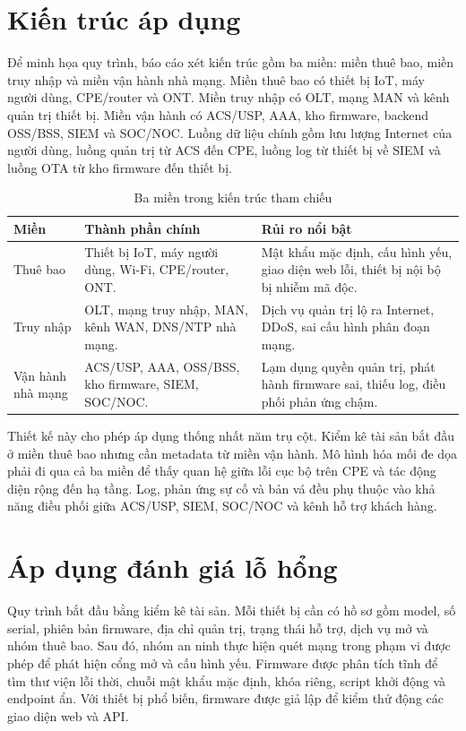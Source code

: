 \documentclass[../DoAn.tex]{subfiles}
\begin{document}
\section{Kiến trúc áp dụng}
Để minh họa quy trình, báo cáo xét kiến trúc gồm ba miền: miền thuê bao, miền truy nhập và miền vận hành nhà mạng. Miền thuê bao có thiết bị IoT, máy người dùng, CPE/router và ONT. Miền truy nhập có OLT, mạng MAN và kênh quản trị thiết bị. Miền vận hành có ACS/USP, AAA, kho firmware, backend OSS/BSS, SIEM và SOC/NOC. Luồng dữ liệu chính gồm lưu lượng Internet của người dùng, luồng quản trị từ ACS đến CPE, luồng log từ thiết bị về SIEM và luồng OTA từ kho firmware đến thiết bị.

\begin{table}[H]
\centering
\begin{tabular}{|p{3cm}|p{4.5cm}|p{5.3cm}|}
\hline
\textbf{Miền} & \textbf{Thành phần chính} & \textbf{Rủi ro nổi bật} \\ \hline
Thuê bao & Thiết bị IoT, máy người dùng, Wi-Fi, CPE/router, ONT. & Mật khẩu mặc định, cấu hình yếu, giao diện web lỗi, thiết bị nội bộ bị nhiễm mã độc. \\ \hline
Truy nhập & OLT, mạng truy nhập, MAN, kênh WAN, DNS/NTP nhà mạng. & Dịch vụ quản trị lộ ra Internet, DDoS, sai cấu hình phân đoạn mạng. \\ \hline
Vận hành nhà mạng & ACS/USP, AAA, OSS/BSS, kho firmware, SIEM, SOC/NOC. & Lạm dụng quyền quản trị, phát hành firmware sai, thiếu log, điều phối phản ứng chậm. \\ \hline
\end{tabular}
\caption{Ba miền trong kiến trúc tham chiếu}
\label{tab:three-domains}
\end{table}

Thiết kế này cho phép áp dụng thống nhất năm trụ cột. Kiểm kê tài sản bắt đầu ở miền thuê bao nhưng cần metadata từ miền vận hành. Mô hình hóa mối đe dọa phải đi qua cả ba miền để thấy quan hệ giữa lỗi cục bộ trên CPE và tác động diện rộng đến hạ tầng. Log, phản ứng sự cố và bản vá đều phụ thuộc vào khả năng điều phối giữa ACS/USP, SIEM, SOC/NOC và kênh hỗ trợ khách hàng.

\section{Áp dụng đánh giá lỗ hổng}
Quy trình bắt đầu bằng kiểm kê tài sản. Mỗi thiết bị cần có hồ sơ gồm model, số serial, phiên bản firmware, địa chỉ quản trị, trạng thái hỗ trợ, dịch vụ mở và nhóm thuê bao. Sau đó, nhóm an ninh thực hiện quét mạng trong phạm vi được phép để phát hiện cổng mở và cấu hình yếu. Firmware được phân tích tĩnh để tìm thư viện lỗi thời, chuỗi mật khẩu mặc định, khóa riêng, script khởi động và endpoint ẩn. Với thiết bị phổ biến, firmware được giả lập để kiểm thử động các giao diện web và API.
\end{document}
